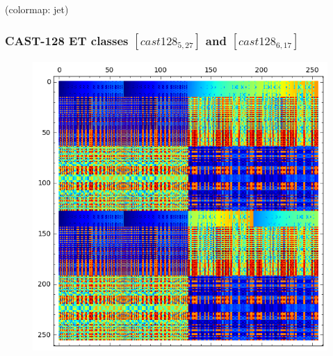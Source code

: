 \documentclass[pdf,sprung,slideColor,nocolorBG]{beamer}
\newenvironment{colortheme}[1]{
\def\ProvidesPackageRCS $##1${\relax}
\renewcommand{\ProcessOptions}{\relax}
\makeatletter

\makeatother
}{}
\newcommand{\slidecite}[1]{\tiny{(#1)}\normalsize{}}
\begin{document}
\begin{colortheme}{jubata}
\begin{frame}
\begin{figure}
\begin{minipage}{.48\textwidth}
  \label{fig:cast128_5_16_bent_cayley_graph_index_matrix}
\end{minipage}%
\end{figure}
\slidecite{colormap: jet}
\end{frame}
\begin{frame}
\frametitle{CAST-128 ET classes $[cast128_{5,27}]$ and $[cast128_{6,17}]$}
\begin{figure}
\centering
\begin{minipage}{.48\textwidth}
  \centering
\includegraphics[width=.9\linewidth]{../matrix_plot/cast128_5_27_bent_cayley_graph_index_matrix.png}
  \label{fig:cast128_5_27_bent_cayley_graph_index_matrix}
\end{minipage}%
\begin{minipage}{.48\textwidth}
  \centering

\end{minipage}
\end{figure}
\end{frame}
\end{colortheme}
\end{document}

